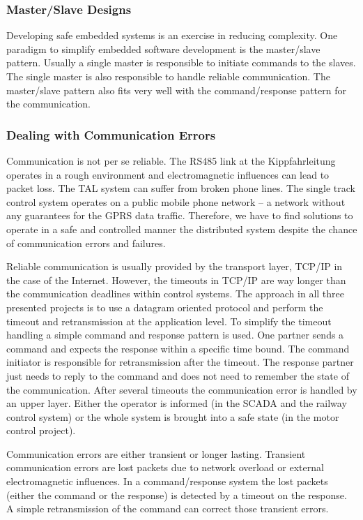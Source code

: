 \subsubsection{Master/Slave Designs}

Developing safe embedded systems is an exercise in reducing
complexity. One paradigm to simplify embedded software development is
the master/slave pattern. Usually a single master is responsible to
initiate commands to the slaves. The single master is also
responsible to handle reliable communication. The master/slave
pattern also fits very well with the command/response pattern for the
communication.

\subsubsection{Dealing with Communication Errors}

Communication is not per se reliable. The RS485 link at the
Kippfahrleitung operates in a rough environment and electromagnetic
influences can lead to packet loss. The TAL system can suffer from
broken phone lines. The single track control system operates on a
public mobile phone network -- a network without any guarantees for
the GPRS data traffic. Therefore, we have to find solutions to
operate in a safe and controlled manner the distributed system
despite the chance of communication errors and failures.

Reliable communication is usually provided by the transport layer,
TCP/IP in the case of the Internet. However, the timeouts in TCP/IP
are way longer than the communication deadlines within control
systems. The approach in all three presented projects is to use a
datagram oriented protocol and perform the timeout and retransmission
at the application level. To simplify the timeout handling a simple
command and response pattern is used. One partner sends a command and
expects the response within a specific time bound. The command
initiator is responsible for retransmission after the timeout. The
response partner just needs to reply to the command and does not need
to remember the state of the communication. After several timeouts
the communication error is handled by an upper layer. Either the
operator is informed (in the SCADA and the railway control system) or
the whole system is brought into a safe state (in the motor control
project).

Communication errors are either transient or longer lasting.
Transient communication errors are lost packets due to network
overload or external electromagnetic influences. In a
command/response system the lost packets (either the command or the
response) is detected by a timeout on the response. A simple
retransmission of the command can correct those transient errors.

